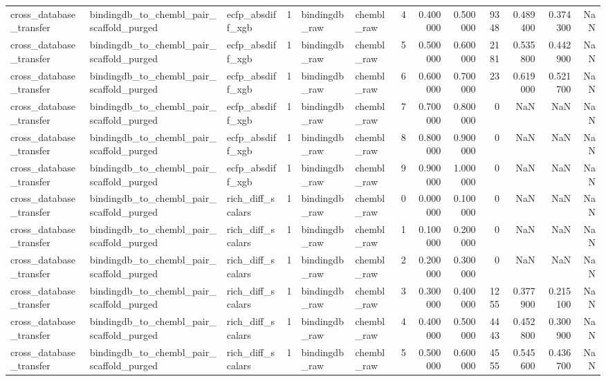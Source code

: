 \begin{longtable}{lllrllrrrrrrr}
cross\_database\_transfer & bindingdb\_to\_chembl\_pair\_scaffold\_purged & ecfp\_absdiff\_xgb & 1 & bindingdb\_raw & chembl\_raw & 4 & 0.400000 & 0.500000 & 9348 & 0.489400 & 0.374300 & NaN \\
cross\_database\_transfer & bindingdb\_to\_chembl\_pair\_scaffold\_purged & ecfp\_absdiff\_xgb & 1 & bindingdb\_raw & chembl\_raw & 5 & 0.500000 & 0.600000 & 2181 & 0.535800 & 0.442900 & NaN \\
cross\_database\_transfer & bindingdb\_to\_chembl\_pair\_scaffold\_purged & ecfp\_absdiff\_xgb & 1 & bindingdb\_raw & chembl\_raw & 6 & 0.600000 & 0.700000 & 23 & 0.619000 & 0.521700 & NaN \\
cross\_database\_transfer & bindingdb\_to\_chembl\_pair\_scaffold\_purged & ecfp\_absdiff\_xgb & 1 & bindingdb\_raw & chembl\_raw & 7 & 0.700000 & 0.800000 & 0 & NaN & NaN & NaN \\
cross\_database\_transfer & bindingdb\_to\_chembl\_pair\_scaffold\_purged & ecfp\_absdiff\_xgb & 1 & bindingdb\_raw & chembl\_raw & 8 & 0.800000 & 0.900000 & 0 & NaN & NaN & NaN \\
cross\_database\_transfer & bindingdb\_to\_chembl\_pair\_scaffold\_purged & ecfp\_absdiff\_xgb & 1 & bindingdb\_raw & chembl\_raw & 9 & 0.900000 & 1.000000 & 0 & NaN & NaN & NaN \\
cross\_database\_transfer & bindingdb\_to\_chembl\_pair\_scaffold\_purged & rich\_diff\_scalars & 1 & bindingdb\_raw & chembl\_raw & 0 & 0.000000 & 0.100000 & 0 & NaN & NaN & NaN \\
cross\_database\_transfer & bindingdb\_to\_chembl\_pair\_scaffold\_purged & rich\_diff\_scalars & 1 & bindingdb\_raw & chembl\_raw & 1 & 0.100000 & 0.200000 & 0 & NaN & NaN & NaN \\
cross\_database\_transfer & bindingdb\_to\_chembl\_pair\_scaffold\_purged & rich\_diff\_scalars & 1 & bindingdb\_raw & chembl\_raw & 2 & 0.200000 & 0.300000 & 0 & NaN & NaN & NaN \\
cross\_database\_transfer & bindingdb\_to\_chembl\_pair\_scaffold\_purged & rich\_diff\_scalars & 1 & bindingdb\_raw & chembl\_raw & 3 & 0.300000 & 0.400000 & 1255 & 0.377900 & 0.215100 & NaN \\
cross\_database\_transfer & bindingdb\_to\_chembl\_pair\_scaffold\_purged & rich\_diff\_scalars & 1 & bindingdb\_raw & chembl\_raw & 4 & 0.400000 & 0.500000 & 4443 & 0.452800 & 0.300900 & NaN \\
cross\_database\_transfer & bindingdb\_to\_chembl\_pair\_scaffold\_purged & rich\_diff\_scalars & 1 & bindingdb\_raw & chembl\_raw & 5 & 0.500000 & 0.600000 & 4555 & 0.545600 & 0.436700 & NaN \\

\end{longtable}
